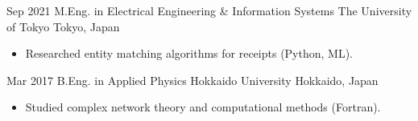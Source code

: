 \documentclass[11pt,letterpaper]{moderncv}
\begin{document}
\cventry
    {Sep 2021}
    {M.Eng. in Electrical Engineering \& Information Systems}
    {The University of Tokyo}
    {Tokyo, Japan}
    {}
    {
      \begin{itemize}
        \item Researched entity matching algorithms for receipts (Python, ML).
      \end{itemize}
    }

\cventry
    {Mar 2017}
    {B.Eng. in Applied Physics}
    {Hokkaido University}
    {Hokkaido, Japan}
    {}
    {
      \begin{itemize}
        \item Studied complex network theory and computational methods (Fortran).
      \end{itemize}
    }
\end{document}
